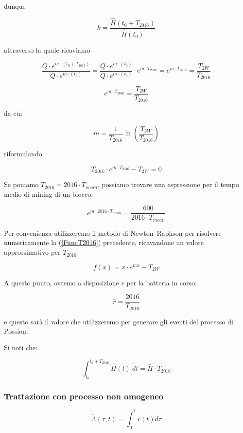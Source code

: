 \documentclass{article}
\begin{document}
dunque

$$
    k = \frac{\hat{H}(t_{0} + T_{2016})}{\hat{H}(t_{0})}
$$

attraverso la quale ricaviamo

$$
\frac{Q \cdot e^{m \cdot (t_{0} + T_{2016})}}{Q \cdot e^{m \cdot (t_{0})}} = \frac{ Q \cdot e^{m \cdot (t_{0})} }{ Q \cdot e^{m \cdot (t_{0})} } \cdot e^{m \cdot T_{2016}} = e^{m \cdot T_{2016}} = \frac{T_{2W}}{T_{2016}} 
$$

$$
    e^{m \cdot T_{2016}} = \frac{T_{2W}}{T_{2016}}
$$

da cui

$$
m = \frac{1}{T_{2016}} \ln(\frac{T_{2W}}{T_{2016}})
$$

riformulando

\begin{equation}
    T_{2016} \cdot e^{m \cdot T_{2016}} - T_{2W} = 0 \label{FuncT2016}
\end{equation}

Se poniamo $T_{2016} = 2016 \cdot T_{mean}$, possiamo trovare una espressione per il tempo medio di mining di un blocco:

$$
    e^{m \cdot 2016 \cdot T_{mean}} = \frac{600}{2016 \cdot T_{mean}}
$$

Per convenienza utilizzeremo il metodo di Newton–Raphson per risolvere numericamente la (\ref{FuncT2016}) precedente, ricavandone un valore approssimativo per $T_{2016}$

\begin{equation}
    f(x) = x \cdot e^{mx} - T_{2W}
\end{equation}

A questo punto, avremo a disposizione $r$ per la batteria in corso:

$$
    \hat{r} = \frac{2016}{T_{2016}}
$$

e questo sarà il valore che utilizzeremo per generare gli eventi del processo di Possion.

Si noti che:

\begin{equation}
    \int_{t_{0}}^{ t_{0} + T_{2016} } \hat{H}(t) \ dt = \bar{H} \cdot T_{2016}
\end{equation}

\subsubsection{Trattazione con processo non omogeneo}

\begin{equation}
    \tilde{\Lambda}(\tau, t) = \int_{0}^{t} r(t) d\tau
\end{equation}
\end{document}
